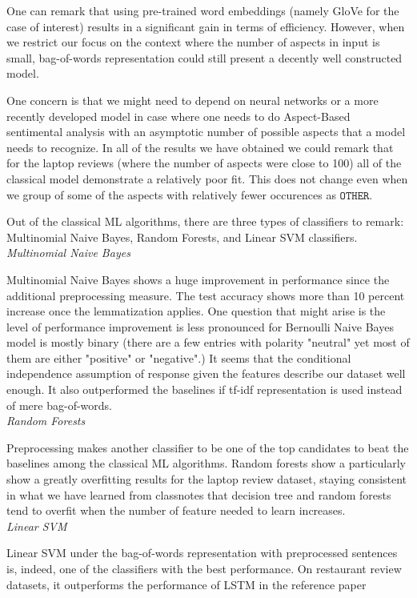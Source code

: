 \documentclass[comsoc,conference]{IEEEtran}
\begin{document}
\par One can remark that using pre-trained word embeddings (namely GloVe for the case of interest) results in a significant gain in terms of efficiency. However, when we restrict our focus on the context where the number of aspects in input is small, bag-of-words representation could still present a decently well constructed model. 
\par One concern is that we might need to depend on neural networks or a more recently developed model in case where one needs to do Aspect-Based sentimental analysis with an asymptotic number of possible aspects that a model needs to recognize. In all of the results we have obtained we could remark that for the laptop reviews (where the number of aspects were close to 100) all of the classical model demonstrate a relatively poor fit. This does not change even when we group of some of the aspects with relatively fewer occurences as $\texttt{OTHER}$. 
\par Out of the classical ML algorithms, there are three types of classifiers to remark: Multinomial Naive Bayes, Random Forests, and Linear SVM classifiers.
\\\emph{Multinomial Naive Bayes}
\par Multinomial Naive Bayes shows a huge improvement in performance since the additional preprocessing measure. The test accuracy shows more than 10 percent increase once the lemmatization applies. One question that might arise is the level of performance improvement is less pronounced for Bernoulli Naive Bayes model is mostly binary (there are a few entries with polarity "neutral" yet most of them are either "positive" or "negative".) It seems that the conditional independence assumption of response given the features describe our dataset well enough. It also outperformed the baselines if tf-idf representation is used instead of mere bag-of-words.
\\ \emph{Random Forests}
\par Preprocessing makes another classifier to be one of the top candidates to beat the baselines among the classical ML algorithms. Random forests show a particularly show a greatly overfitting results for the laptop review dataset, staying consistent in what we have learned from classnotes that decision tree and random forests tend to overfit when the number of feature needed to learn increases.
\\ \emph{Linear SVM}
\par Linear SVM under the bag-of-words  representation with preprocessed sentences is, indeed, one of the classifiers with the best performance. On restaurant review datasets, it outperforms the performance of LSTM in the reference paper
\end{document}

